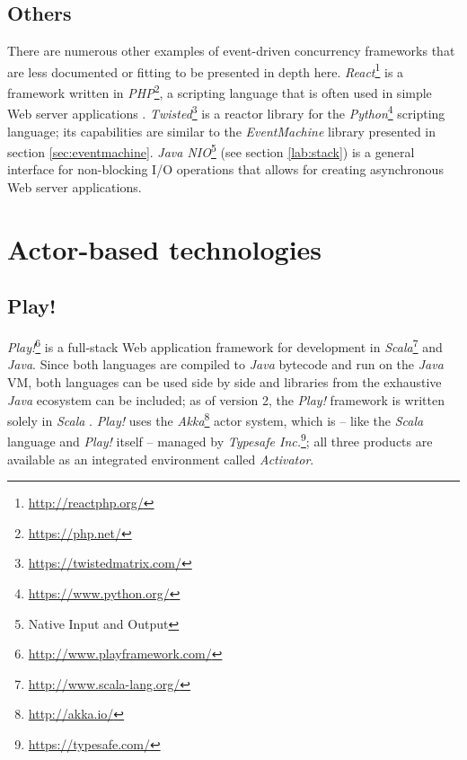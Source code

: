 \subsection{Others}
\label{lab:other-event}
There are numerous other examples of event-driven concurrency frameworks that are less documented or fitting to be presented in depth here. \textit{React}\footnote{\url{http://reactphp.org/}} is a framework written in \textit{PHP}\footnote{\url{https://php.net/}}, a scripting language that is often used in simple Web server applications \cite[p. 36]{Erb2012}. \textit{Twisted}\footnote{\url{https://twistedmatrix.com/}} is a reactor library for the \textit{Python}\footnote{\url{https://www.python.org/}} scripting language; its capabilities are similar to the \textit{EventMachine} library presented in section \ref{sec:eventmachine}. \textit{Java NIO}\footnote{Native Input and Output} (see section \ref{lab:stack}) is a general interface for non-blocking I/O operations that allows for creating asynchronous Web server applications.

\section{Actor-based technologies}

\subsection{Play!}
\label{lab:play}
\textit{Play!}\footnote{\url{http://www.playframework.com/}} is a full-stack Web application framework for development in \textit{Scala}\footnote{\url{http://www.scala-lang.org/}} and \textit{Java}. Since both languages are compiled to \textit{Java} bytecode and run on the \textit{Java} VM, both languages can be used side by side and libraries from the exhaustive \textit{Java} ecosystem can be included; as of version 2, the \textit{Play!} framework is written solely in \textit{Scala} \cite{Scala}. \textit{Play!} uses the \textit{Akka}\footnote{\url{http://akka.io/}} actor system, which is -- like the \textit{Scala} language and \textit{Play!} itself -- managed by \textit{Typesafe Inc.}\footnote{\url{https://typesafe.com/}}; all three products are available as an integrated environment called \textit{Activator}. 

